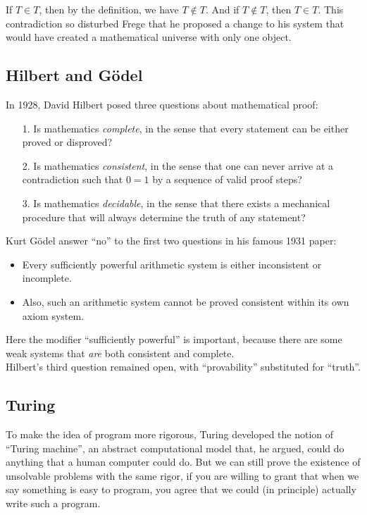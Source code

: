 \documentclass[12pt]{article}
\theoremstyle{plain}
\theoremstyle{definition}
\newcommand{\lecture}[1]{\marginpar{{\footnotesize $\leftarrow$ \underline{#1}}}}
\begin{document}
If $T \in T$, then by the definition, we have $T \not\in T$.
And if $T \not\in T$, then $T \in T$.
This contradiction so disturbed Frege that he proposed a change to his system that would have created a mathematical universe with only one object.

\subsection{Hilbert and G\"odel}
In 1928, David Hilbert posed three questions about mathematical proof:
\begin{enumerate}
  \item[1.] Is mathematics \emph{complete}, in the sense that every statement can be either proved or disproved?

  \item[2.] Is mathematics \emph{consistent}, in the sense that one can never arrive at a contradiction such that $0 = 1$ by a sequence of valid proof steps?

  \item[3.] Is mathematics \emph{decidable}, in the sense that there exists a mechanical procedure that will always determine the truth of any statement?
\end{enumerate}

Kurt G\"odel answer ``no'' to the first two questions in his famous 1931 paper:
\begin{itemize}
  \item Every sufficiently powerful arithmetic system is either inconsistent or incomplete.

  \item Also, such an arithmetic system cannot be proved consistent within its own axiom system.
\end{itemize}

Here the modifier ``sufficiently powerful'' is important, because there are some weak systems that \emph{are} both consistent and complete. \\

Hilbert's third question remained open, with ``provability'' substituted for ``truth''.

\subsection{Turing}
\lecture{2016/12/01}
To make the idea of program more rigorous, Turing developed the notion of ``Turing machine'', an abstract computational model that, he argued, could do anything that a human computer could do.
But we can still prove the existence of unsolvable problems with the same rigor, if you are willing to grant that when we say something is easy to program, you agree that we could (in principle) actually write such a program. \\
\end{document}
